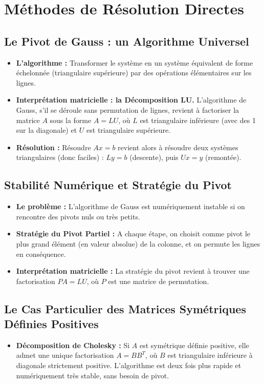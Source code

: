 \documentclass[12pt, a4paper, parskip=full]{report}
\theoremstyle{agregstyle}
\begin{document}
\section{Méthodes de Résolution Directes}

\subsection{Le Pivot de Gauss : un Algorithme Universel}
\begin{itemize}
    \item \textbf{L'algorithme :} Transformer le système en un système équivalent de forme échelonnée (triangulaire supérieure) par des opérations élémentaires sur les lignes.
    \item \textbf{Interprétation matricielle : la Décomposition LU.} L'algorithme de Gauss, s'il se déroule sans permutation de lignes, revient à factoriser la matrice $A$ sous la forme $A=LU$, où $L$ est triangulaire inférieure (avec des 1 sur la diagonale) et $U$ est triangulaire supérieure.
    \item \textbf{Résolution :} Résoudre $Ax=b$ revient alors à résoudre deux systèmes triangulaires (donc faciles) : $Ly=b$ (descente), puis $Ux=y$ (remontée).
\end{itemize}

\subsection{Stabilité Numérique et Stratégie du Pivot}
\begin{itemize}
    \item \textbf{Le problème :} L'algorithme de Gauss est numériquement instable si on rencontre des pivots nuls ou très petits.
    \item \textbf{Stratégie du Pivot Partiel :} A chaque étape, on choisit comme pivot le plus grand élément (en valeur absolue) de la colonne, et on permute les lignes en conséquence.
    \item \textbf{Interprétation matricielle :} La stratégie du pivot revient à trouver une factorisation $PA=LU$, où $P$ est une matrice de permutation.
\end{itemize}

\subsection{Le Cas Particulier des Matrices Symétriques Définies Positives}
\begin{itemize}
    \item \textbf{Décomposition de Cholesky :} Si $A$ est symétrique définie positive, elle admet une unique factorisation $A=B B^T$, où $B$ est triangulaire inférieure à diagonale strictement positive. L'algorithme est deux fois plus rapide et numériquement très stable, sans besoin de pivot.
\end{itemize}
\end{document}
